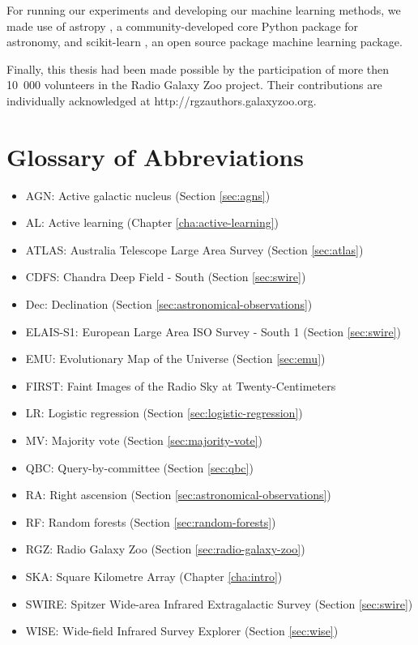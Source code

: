   For running our experiments and developing our machine learning methods, we
  made use of astropy \citep{astropy}, a community-developed core Python package
  for astronomy, and scikit-learn \citep{scikit-learn}, an open source package
  machine learning package.

  Finally, this thesis had been made possible by the participation of more then
  10~000 volunteers in the Radio Galaxy Zoo project. Their contributions are
  individually acknowledged at http://rgzauthors.galaxyzoo.org.

\section{Glossary of Abbreviations}

  \begin{itemize}
    \item AGN: Active galactic nucleus (Section \ref{sec:agns})
    \item AL: Active learning (Chapter \ref{cha:active-learning})
    \item ATLAS: Australia Telescope Large Area Survey (Section \ref{sec:atlas})
    \item CDFS: Chandra Deep Field - South (Section \ref{sec:swire})
    \item Dec: Declination (Section \ref{sec:astronomical-observations})
    \item ELAIS-S1: European Large Area ISO Survey - South 1 (Section \ref{sec:swire})
    \item EMU: Evolutionary Map of the Universe (Section \ref{sec:emu})
    \item FIRST: Faint Images of the Radio Sky at Twenty-Centimeters
    \item LR: Logistic regression (Section \ref{sec:logistic-regression})
    \item MV: Majority vote (Section \ref{sec:majority-vote})
    \item QBC: Query-by-committee (Section \ref{sec:qbc})
    \item RA: Right ascension (Section \ref{sec:astronomical-observations})
    \item RF: Random forests (Section \ref{sec:random-forests})
    \item RGZ: Radio Galaxy Zoo (Section \ref{sec:radio-galaxy-zoo})
    \item SKA: Square Kilometre Array (Chapter \ref{cha:intro})
    \item SWIRE: Spitzer Wide-area Infrared Extragalactic Survey (Section \ref{sec:swire})
    \item WISE: Wide-field Infrared Survey Explorer (Section \ref{sec:wise})
  \end{itemize}
